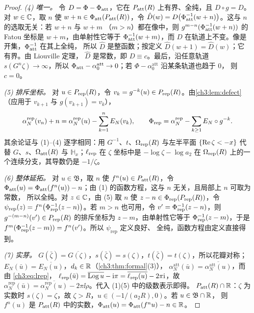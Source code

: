 \begin{proof}
\emph{(4) 唯一。} 令 $D=\Phi-\Phi_{\mathrm{att}}$，它在 $P_{\mathrm{att}}(R)$ 上有界、全纯，且 $D\circ g=D$。
对 $w\in\mathbb{C}$，取 $n$ 使 $w+n\in\Phi_{\mathrm{att}}(P_{\mathrm{att}}(R))$，令
$\hat D(w)=D\bigl(\Phi_{\mathrm{att}}^{-1}(w+n)\bigr)$。这与 $n$ 的选取无关：若 $w+n$ 与 $w+m$
（$m>n$）都在像中，则 $g^{m-n}(\Phi_{\mathrm{att}}^{-1}(w+n))$ 的 Fatou 坐标是 $w+m$，由单射性它等于
$\Phi_{\mathrm{att}}^{-1}(w+m)$，而 $D$ 在轨道上不变。像是开集，$\Phi_{\mathrm{att}}^{-1}$ 在其上全纯，
所以 $\hat D$ 是整函数；按定义 $\hat D(w+1)=\hat D(w)$；它有界。由 Liouville 定理，
$\hat D$ 是常数，即 $D\equiv c$。最后，沿任意轨道 $s(G^n\zeta)\to\infty$，所以
$\Phi_{\mathrm{att}}-\alpha_0^{\mathrm{att}}\to0$；若 $\Phi-\alpha_0^{\mathrm{att}}$ 沿某条轨道也趋于 $0$，
则 $c=0$。

\emph{(5) 排斥坐标。} 对 $u\in P_{\mathrm{rep}}(R)$，令 $v_k=g^{-k}(u)\in P_{\mathrm{rep}}(R)$。由\cref{ch3:lem:defect}
（应用于 $v_{k+1}$ 与 $g(v_{k+1})=v_k$），
\[
 \alpha_N^{\mathrm{rep}}(v_n)+n=\alpha_N^{\mathrm{rep}}(u)-\sum_{k=1}^{n}E_N(v_k),\qquad
 \Phi_{\mathrm{rep}}=\alpha_N^{\mathrm{rep}}-\sum_{k\ge1}E_N\circ g^{-k}.
\]
其余论证与 (1)--(4) 逐字相同：用 $G^{-1}$、$t$、$\Omega_{\mathrm{rep}}(R)$ 与左半平面
$\{\operatorname{Re}\zeta<-x\}$ 代替 $G$、$s$、$\Omega_{\mathrm{att}}(R)$ 与 $\mathbb H_x$；$\ell_{\mathrm{rep}}$ 在 $\zeta$ 坐标中是
$-\log\zeta-\log a_2$ 在 $\Omega_{\mathrm{rep}}(R)$ 上的一个连续分支，其导数仍是 $-1/\zeta$。

\emph{(6) 整体延拓。} 对 $u\in\mathfrak B$，取 $n$ 使 $f^n(u)\in P_{\mathrm{att}}(R)$，令
$\Phi_{\mathrm{att}}(u)=\Phi_{\mathrm{att}}(f^n(u))-n$；由 (1) 的函数方程，这与 $n$ 无关，且局部上 $n$ 可取为常数，
所以全纯。对 $z\in\mathbb{C}$，由 (5) 取 $n$ 使 $z-n\in\Phi_{\mathrm{rep}}(P_{\mathrm{rep}}(R))$，令
$\psi_{\mathrm{rep}}(z)=f^n\bigl(\Phi_{\mathrm{rep}}^{-1}(z-n)\bigr)$。若 $m>n$ 也可用，令
$v'=\Phi_{\mathrm{rep}}^{-1}(z-n)$，则 $g^{-(m-n)}(v')\in P_{\mathrm{rep}}(R)$ 的排斥坐标为 $z-m$，由单射性它等于
$\Phi_{\mathrm{rep}}^{-1}(z-m)$，于是 $f^m(\Phi_{\mathrm{rep}}^{-1}(z-m))=f^n(v')$。所以 $\psi_{\mathrm{rep}}$ 定义良好、
全纯，函数方程由定义直接得到。

\emph{(7) 实芽。} $G(\bar\zeta)=\overline{G(\zeta)}$，$s(\bar\zeta)=s(\zeta)$，$t(\bar\zeta)=t(\zeta)$，所以花瓣对称；
$E_N(\bar u)=\overline{E_N(u)}$，$d_k\in\mathbb{R}$（\cref{ch3:thm:formal}(3)），
$\alpha_N^{\mathrm{att}}(\bar u)=\overline{\alpha_N^{\mathrm{att}}(u)}$，而由 \eqref{ch3:eq:lrep}，
$\ell_{\mathrm{rep}}(\bar u)=\overline{\operatorname{Log} u}-\mathrm{i}\pi=\overline{\ell_{\mathrm{rep}}(u)}-2\pi\mathrm{i}$，故
$\alpha_N^{\mathrm{rep}}(\bar u)=\overline{\alpha_N^{\mathrm{rep}}(u)}-2\pi\ii\rho$。代入 (1)(5) 中的级数表示即得。
$P_{\mathrm{att}}(R)\cap\mathbb{R}$：$\zeta$ 为实数时 $s(\zeta)=\zeta$，故 $\zeta>R$，$u\in(-1/(a_2R),0)$。若 $u\in\mathfrak B\cap\mathbb{R}$，
则 $f^n(u)$ 是 $P_{\mathrm{att}}(R)$ 中的实数，$\Phi_{\mathrm{att}}(u)=\Phi_{\mathrm{att}}(f^nu)-n\in\mathbb{R}$。
\end{proof}

